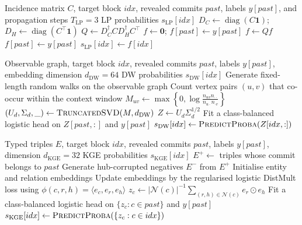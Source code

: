 \documentclass[final,5p,times,twocolumn]{elsarticle}
\theoremstyle{plain}
\begin{document}
\begin{algorithm}[!htbp]
\caption{Clamped Label Propagation scoring}
\label{alg:lp}
\small
\begin{algorithmic}[1]
\Require Incidence matrix $C$, target block $idx$, revealed commits $past$,
  labels $y[past]$, and propagation steps $T_{\mathrm{LP}}=3$
\Ensure LP probabilities $s_{\mathrm{LP}}[idx]$
\State $D_C\gets\operatorname{diag}(C\mathbf 1)$; $D_H\gets\operatorname{diag}(C^\top\mathbf 1)$
\State $Q\gets D_C^\dagger C D_H^\dagger C^\top$
\State $f\gets\mathbf 0$; $f[past]\gets y[past]$
  \State $f\gets Qf$
  \State $f[past]\gets y[past]$
\EndFor
\State \Return $s_{\mathrm{LP}}[idx]\gets f[idx]$
\end{algorithmic}
\end{algorithm}


\begin{algorithm}[!htbp]
\caption{DeepWalk matrix-factorisation scoring}
\label{alg:dw}
\small
\begin{algorithmic}[1]
\Require Observable graph, target block $idx$, revealed commits $past$, labels $y[past]$,
  embedding dimension $d_{\mathrm{DW}}=64$
\Ensure DW probabilities $s_{\mathrm{DW}}[idx]$
\State Generate fixed-length random walks on the observable graph
\State Count vertex pairs $(u,v)$ that co-occur within the context window
\State $M_{uv}\gets\max\!\left\{0,
  \log\frac{n_{uv}n_{\cdot\cdot}}{n_{u\cdot}n_{\cdot v}}\right\}$
\State $(U_d,\Sigma_d,\_)\gets\Call{TruncatedSVD}{M,d_{\mathrm{DW}}}$
\State $Z\gets U_d\Sigma_d^{1/2}$
\State Fit a class-balanced logistic head on $Z[past,:]$ and $y[past]$
\State \Return $s_{\mathrm{DW}}[idx]\gets\Call{PredictProba}{Z[idx,:]}$
\end{algorithmic}
\end{algorithm}


\begin{algorithm}[!htbp]
\caption{DistMult knowledge-graph embedding scoring}
\label{alg:kge}
\small
\begin{algorithmic}[1]
\Require Typed triples $E$, target block $idx$, revealed commits $past$, labels $y[past]$,
  dimension $d_{\mathrm{KGE}}=32$
\Ensure KGE probabilities $s_{\mathrm{KGE}}[idx]$
\State $E^+\gets$ triples whose commit belongs to $past$
\State Generate hub-corrupted negatives $E^-$ from $E^+$
\State Initialise entity and relation embeddings
    \State Update embeddings by the regularised logistic DistMult loss
      using $\phi(c,r,h)=\langle e_c,e_r,e_h\rangle$
  \EndFor
\EndFor
{}
  \State $z_c\gets|\mathcal N(c)|^{-1}
    \sum_{(r,h)\in\mathcal N(c)}e_r\odot e_h$
\EndFor
\State Fit a class-balanced logistic head on $\{z_c:c\in past\}$ and $y[past]$
\State \Return $s_{\mathrm{KGE}}[idx]\gets\Call{PredictProba}{\{z_c:c\in idx\}}$
\end{algorithmic}
\end{algorithm}
\end{document}
